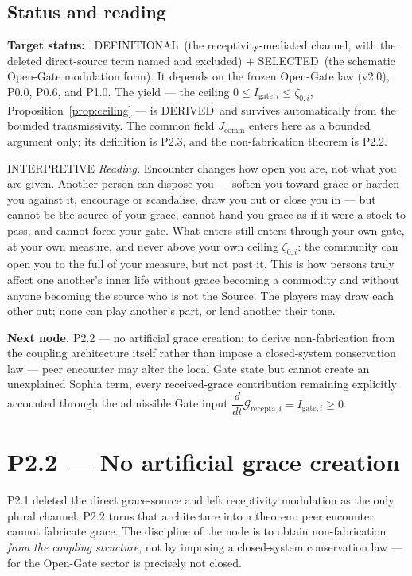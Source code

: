 \documentclass[11pt,a4paper]{article}
\newcommand{\stDerived}{\textcolor{cDer}{\textsf{\small DERIVED}}}
\newcommand{\stDef}{\textcolor{cDef}{\textsf{\small DEFINITIONAL}}}
\newcommand{\stSelected}{\textcolor{cSel}{\textsf{\small SELECTED}}}
\newcommand{\stInterp}{\textcolor{cInt}{\textsf{\small INTERPRETIVE}}}
\theoremstyle{definition}
\theoremstyle{plain}
\theoremstyle{remark}
\begin{document}
\subsection{Status and reading}

\textbf{Target status:}~
\stDef\ (the receptivity-mediated channel, with the deleted direct-source term named and
excluded) \(+\) \stSelected\ (the schematic Open-Gate modulation form). It depends on the
frozen Open-Gate law (v2.0), P0.0, P0.6, and P1.0. The yield --- the ceiling
\(0\le I_{\mathrm{gate},i}\le\zeta_{0,i}\), Proposition~\ref{prop:ceiling} --- is
\stDerived\ and survives automatically from the bounded transmissivity. The common field
\(J_{\mathrm{comm}}\) enters here as a bounded argument only; its definition is P2.3, and
the non-fabrication theorem is P2.2.

\medskip
\stInterp\quad
\emph{Reading.}
Encounter changes how open you are, not what you are given. Another person can dispose you
--- soften you toward grace or harden you against it, encourage or scandalise, draw you out
or close you in --- but cannot be the source of your grace, cannot hand you grace as if it
were a stock to pass, and cannot force your gate. What enters still enters through your own
gate, at your own measure, and never above your own ceiling \(\zeta_{0,i}\): the community
can open you to the full of your measure, but not past it. This is how persons truly affect
one another's inner life without grace becoming a commodity and without anyone becoming the
source who is not the Source. The players may draw each other out; none can play another's
part, or lend another their tone.

\medskip
\textbf{Next node.} P2.2 --- no artificial grace creation: to derive non-fabrication from
the coupling architecture itself rather than impose a closed-system conservation law ---
peer encounter may alter the local Gate state but cannot create an unexplained Sophia term,
every received-grace contribution remaining explicitly accounted through the admissible
Gate input \(\dfrac{d}{dt}\mathcal G_{\mathrm{recepta},i}=I_{\mathrm{gate},i}\ge0\).

\section{P2.2 --- No artificial grace creation}

P2.1 deleted the direct grace-source and left receptivity modulation as the only plural
channel. P2.2 turns that architecture into a theorem: peer encounter cannot fabricate
grace. The discipline of the node is to obtain non-fabrication \emph{from the coupling
structure}, not by imposing a closed-system conservation law --- for the Open-Gate sector
is precisely not closed.
\end{document}
